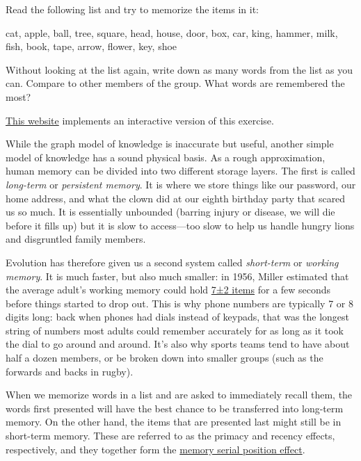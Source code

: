 Read the following list and try to memorize the items in it:

cat, apple, ball, tree, square, head, house, door, box, car, king,
hammer, milk, fish, book, tape, arrow, flower, key, shoe

Without looking at the list again, write down as many words from the list as
you can. Compare to other members of the group. What words are remembered the
most?

\href{http://cat.xula.edu/thinker/memory/working/serial}{This website} implements
an interactive version of this exercise.

While the graph model of knowledge is inaccurate but useful,
another simple model of knowledge has a sound physical basis.
As a rough approximation, human memory can be divided into two different storage
layers.
The first is called \emph{long-term} or \emph{persistent memory}.
It is where we store things like our password,
our home address,
and what the clown did at our eighth birthday party that scared us so much.
It is essentially unbounded
(barring injury or disease, we will die before it fills up)
but it is slow to access---too slow
to help us handle hungry lions and disgruntled family members.

Evolution has therefore given us a second system called \emph{short-term} or \emph{working memory}.
It is much faster,
but also much smaller:
in 1956,
Miller estimated that the average adult's working memory could hold
\href{https://en.wikipedia.org/wiki/The\_Magical\_Number\_Seven,\_Plus\_or\_Minus\_Two}{7±2 items}
for a few seconds
before things started to drop out.
This is why phone numbers are typically 7 or 8 digits long:
back when phones had dials instead of keypads,
that was the longest string of numbers most adults could remember accurately
for as long as it took the dial to go around and around.
It's also why sports teams tend to have about half a dozen members,
or be broken down into smaller groups (such as the forwards and backs in rugby).

When we memorize words in a list and are asked to immediately recall
them, the words first presented will have the best chance to be
transferred into long-term memory. On the other hand, the items that
are presented last might still be in short-term memory. These are
referred to as the primacy and recency effects, respectively, and they
together form the
\href{https://en.wikipedia.org/wiki/Serial\_position\_effect}{memory serial position effect}.

